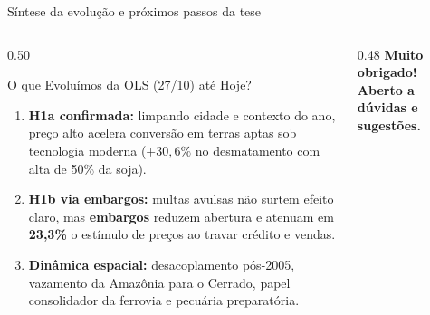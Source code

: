 \documentclass[aspectratio=169,10.5pt]{beamer}
\newcommand{\fonte}[1]{\par\vspace{1mm}{\fontsize{6.5}{7.5}\selectfont\color{gray}Fonte: #1\par}}
\begin{document}
\begin{frame}{Síntese da evolução e próximos passos da tese}
\begin{columns}[T]
\begin{column}{0.50\textwidth}
\begin{block}{O que Evoluímos da OLS (27/10) até Hoje?}
\fontsize{8}{9.6}\selectfont
\begin{enumerate}
    \setlength{\itemsep}{1.1mm}
    \item \textbf{H1a confirmada:} limpando cidade e contexto do ano, preço alto acelera conversão em terras aptas sob tecnologia moderna ($+30{,}6\%$ no desmatamento com alta de 50\% da soja).
    \item \textbf{H1b via embargos:} multas avulsas não surtem efeito claro, mas \textbf{embargos} reduzem abertura e atenuam em \textbf{23,3\%} o estímulo de preços ao travar crédito e vendas.
    \item \textbf{Dinâmica espacial:} desacoplamento pós-2005, vazamento da Amazônia para o Cerrado, papel consolidador da ferrovia e pecuária preparatória.
\end{enumerate}
\end{block}
\end{column}

\begin{column}{0.48\textwidth}
\centering\color{verde}\textbf{Muito obrigado! Aberto a dúvidas e sugestões.}
\end{column}
\end{columns}
\end{frame}
\end{document}
